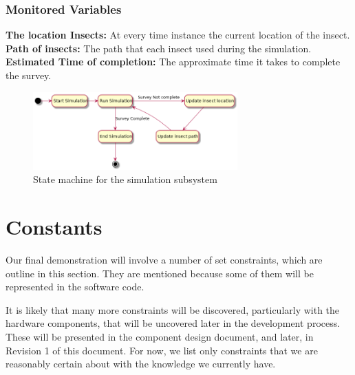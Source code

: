 \documentclass[11pt]{article}
\begin{document}
\subsubsection{Monitored Variables}
\textbf{The location Insects:} At every time instance the current location of the insect. \\
\textbf{Path of insects:} The path that each insect used during the simulation.\\
\textbf{Estimated Time of completion:} The 
approximate time it takes to complete the survey.

\begin{figure}[H]
   \centering
   \includegraphics[width=0.7\textwidth]{diagram/simulation.png}
   \caption{State machine for the simulation subsystem}
   \label{fig:algorithm-fsm}
\end{figure}




\section{Constants}

Our final demonstration will involve a number of set constraints, which are outline in this section. They are mentioned because some 
of them will be represented in the software code.

It is likely that many more constraints will be discovered, particularly with the hardware components, that will be uncovered later in the
development process. These will be presented in the component design document, and later, in Revision 1 of this document. For now, we list only
constraints that we are reasonably certain about with the knowledge we currently have.
\end{document}
